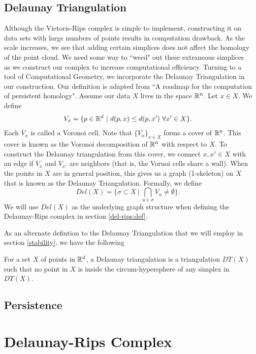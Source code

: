 \documentclass[letterpaper,titlepage]{article}
\begin{document}
\subsection{Delaunay Triangulation}
Although the Vietoris-Rips complex is simple to implement, constructing it on data sets with large numbers of points results in computation drawback. As the scale increases, we see that adding certain simplices does not affect the homology of the point cloud. We need some way to ``weed" out these extraneous simplices as we construct our complex to increase computational efficiency. Turning to a tool of Computational Geometry, we incorporate the Delaunay Triangulation in our construction. Our definition is adapted from ``A roadmap for the computation of persistent homology"\cite{Roadmap}. Assume our data $X$ lives in the space $\mathbb{R}^n$. Let $x \in X$. We define
$$V_x = \{p \in \mathbb{R}^d\ |\ d(p,x) \leq d(p, x')\ \forall x' \in X\}.$$
Each $V_x$ is called a Voronoi cell. Note that $\{V_x\}_{x \in X}$ forms a cover of $\mathbb{R}^n$. This cover is known as the Voronoi decomposition of $\mathbb{R}^n$ with respect to $X$. To construct the Delaunay triangulation from this cover, we connect $x,x' \in X$ with an edge if $V_x$ and $V_{x'}$ are neighbors (that is, the Vornoi cells share a wall). When the points in $X$ are in general position, this gives us a graph (1-skeleton) on $X$ that is known as the Delaunay Triangulation. Formally, we define \cite{Edelsbrunner}
$$Del(X) = \{\sigma \subset X\ |\ \bigcap_{u \in \sigma} V_u \neq \emptyset\}.$$
We will use $Del(X)$ as the underlying graph structure when defining the Delaunay-Rips complex in section \ref{del-rips:def}.

As an alternate defintion to the Delaunay Triangulation that we will employ in section \ref{stability}, we have the following

\begin{defn}
For a set $X$ of points in $\mathbb{R}^d$, a Delaunay triangulation is a triangulation $DT(X)$ such that no point in $X$ is inside the circum-hypersphere of any simplex in $DT(X)$. 
\end{defn}

\subsection{Persistence}


\section{Delaunay-Rips Complex}
\end{document}

